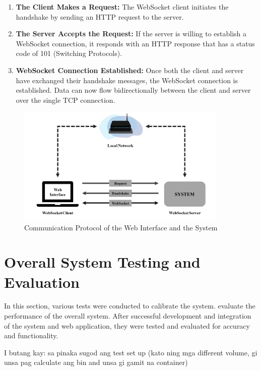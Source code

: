 \begin{enumerate}
	\item \textbf{The Client Makes a Request:} The WebSocket client initiates the handshake by sending an HTTP request to the server.
	\item \textbf{The Server Accepts the Request:} If the server is willing to establish a WebSocket connection, it responds with an HTTP response that has a status code of 101 (Switching Protocols).
	\item \textbf{WebSocket Connection Established:} Once both the client and server have exchanged their handshake messages, the WebSocket connection is established. Data can now flow bidirectionally between the client and server over the single TCP connection.
\end{enumerate}

\begin{figure}[H]
	\centering
	\includegraphics[width=0.9\textwidth]{Figures/websocket-connection}
	\caption{Communication Protocol of the Web Interface and the System}
	\label{ch3:fig:websocket-connection}
\end{figure}

\section{Overall System Testing and Evaluation}
\label{ch3:sec:TestingAndEvaluation}

In this section, various tests were conducted to calibrate the system.  evaluate the performance of the overall system. After successful development and integration of the system and web application, they were tested and evaluated for accuracy and functionality.

I butang kay: sa pinaka sugod ang test set up (kato ning mga different volume, gi unsa pag calculate ang bin and unsa gi gamit na container)

